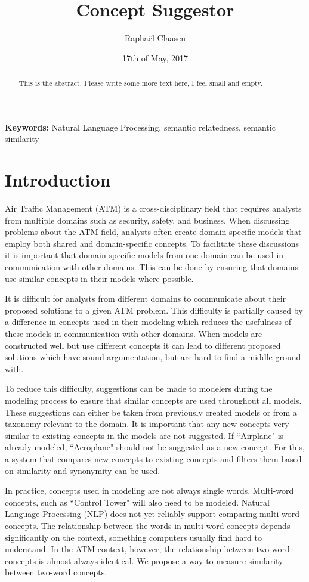 \documentclass{article}
\title{Concept Suggestor}
\date{17th of May, 2017}
\author{Rapha\"el Claasen}
\begin{document}
\maketitle

\begin{abstract}
This is the abstract. Please write some more text here, I feel small and empty.
\end{abstract}

{\bf Keywords:} Natural Language Processing, semantic relatedness, semantic similarity

\section{Introduction} \label{sec:introduction}

Air Traffic Management (ATM) is a cross-disciplinary field that requires analysts from multiple domains such as security, safety, and business. When discussing problems about the ATM field, analysts often create domain-specific models that employ both shared and domain-specific concepts. To facilitate these discussions it is important that domain-specific models from one domain can be used in communication with other domains. This can be done by ensuring that domains use similar concepts in their models where possible.

It is difficult for analysts from different domains to communicate about their proposed solutions to a given ATM problem. This difficulty is partially caused by a difference in concepts used in their modeling which reduces the usefulness of these models in communication with other domains. When models are constructed well but use different concepts it can lead to different proposed solutions which have sound argumentation, but are hard to find a middle ground with.

To reduce this difficulty, suggestions can be made to modelers during the modeling process to ensure that similar concepts are used throughout all models. These suggestions can either be taken from previously created models or from a taxonomy relevant to the domain. 
It is important that any new concepts very similar to existing concepts in the models are not suggested. If ``Airplane" is already modeled, ``Aeroplane" should not be suggested as a new concept. For this, a system that compares new concepts to existing concepts and filters them based on similarity and synonymity can be used.

In practice, concepts used in modeling are not always single words. Multi-word concepts, such as ``Control Tower" will also need to be modeled. Natural Language Processing (NLP) does not yet reliably support comparing multi-word concepts. The relationship between the words in multi-word concepts depends significantly on the context, something computers usually find hard to understand. In the ATM context, however, the relationship between two-word concepts is almost always identical. We propose a way to measure similarity between two-word concepts.
\end{document}

